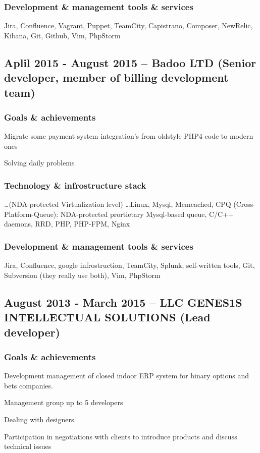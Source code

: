 \documentclass[9pt, a4paper, english]{extarticle}
\begin{document}
    \subsubsection* {Development \& management tools \& services}
      Jira, Confluence, Vagrant, Puppet, TeamCity, Capistrano, Composer,
      NewRelic, Kibana, Git, Github, Vim, PhpStorm


  \subsection* {Aplil 2015 - August 2015 -- \textbf{Badoo LTD} (Senior developer, member of billing development team)}
    \subsubsection* {Goals \& achievements}
      \begin {list}{\textbullet}{\itemsep=0mm}
        \item Migrate some payment system integration's from oldstyle PHP4 code to modern ones
        \item Solving daily problems
      \end{list}
    \subsubsection* {Technology \& infrostructure stack}
      \ldots (NDA-protected Virtualization level) \ldots Linux, Mysql, Memcached,
      CPQ (Cross-Platform-Queue): NDA-protected prortietary Mysql-based queue,
      C/C++ daemons, RRD, PHP, PHP-FPM, Nginx
    \subsubsection* {Development \& management tools \& services}
      Jira, Confluence, google infrostruction, TeamCity, Splunk, self-written
      tools, Git, Subversion (they really use both), Vim, PhpStorm


  \subsection* {August 2013 - March 2015 -- \textbf{LLC GENES1S INTELLECTUAL SOLUTIONS} (Lead developer)}
    \subsubsection* {Goals \& achievements}
      \begin {list}{\textbullet}{\itemsep=0mm}
        \item Development management of closed indoor ERP system for binary options and bets companies.
        \item Management group up to 5 developers
        \item Dealing with designers
        \item Participation in negotiations with clients to introduce products and discuss technical issues
      \end{list}
\end{document}

